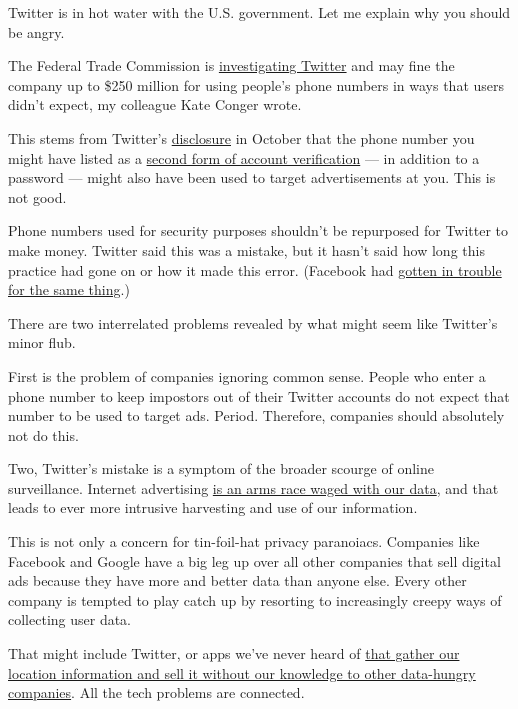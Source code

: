 Twitter is in hot water with the U.S. government. Let me explain why you
should be angry.

The Federal Trade Commission is
\href{https://www.nytimes.com/2020/08/03/technology/ftc-twitter-privacy-violations.html}{investigating
Twitter} and may fine the company up to \$250 million for using people's
phone numbers in ways that users didn't expect, my colleague Kate Conger
wrote.

This stems from Twitter's
\href{https://help.twitter.com/en/information-and-ads}{disclosure} in
October that the phone number you might have listed as a
\href{https://www.nytimes.com/2017/08/08/technology/personaltech/protecting-your-accounts-by-text-or-app.html}{second
form of account verification} --- in addition to a password --- might
also have been used to target advertisements at you. This is not good.

Phone numbers used for security purposes shouldn't be repurposed for
Twitter to make money. Twitter said this was a mistake, but it hasn't
said how long this practice had gone on or how it made this error.
(Facebook had
\href{https://www.washingtonpost.com/technology/2019/07/23/facebook-deceived-users-about-way-it-used-phone-numbers-facial-recognition-ftc-allege-complaint/}{gotten
in trouble for the same thing}.)

There are two interrelated problems revealed by what might seem like
Twitter's minor flub.

First is the problem of companies ignoring common sense. People who
enter a phone number to keep impostors out of their Twitter accounts do
not expect that number to be used to target ads. Period. Therefore,
companies should absolutely not do this.

Two, Twitter's mistake is a symptom of the broader scourge of online
surveillance. Internet advertising
\href{https://www.nytimes.com/2020/07/15/technology/just-collect-less-data-period.html}{is
an arms race waged with our data}, and that leads to ever more intrusive
harvesting and use of our information.

This is not only a concern for tin-foil-hat privacy paranoiacs.
Companies like Facebook and Google have a big leg up over all other
companies that sell digital ads because they have more and better data
than anyone else. Every other company is tempted to play catch up by
resorting to increasingly creepy ways of collecting user data.

That might include Twitter, or apps we've never heard of
\href{https://www.nytimes.com/interactive/2018/12/10/business/location-data-privacy-apps.html}{that
gather our location information and sell it without our knowledge to
other data-hungry companies}. All the tech problems are connected.

